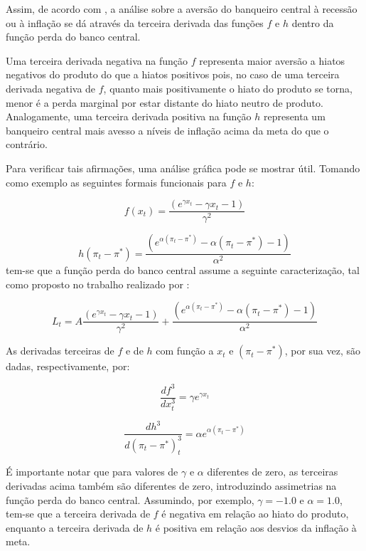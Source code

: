 \documentclass[
	article,			%
	11pt,				%
	oneside,			%
	a4paper,			%
	english,			%
	brazil,				%
	]{abntex2}
\begin{document}
	Assim, de acordo com , a análise sobre a aversão do banqueiro central à recessão ou à inflação se dá através da terceira derivada das funções $f$ e $h$ dentro da função perda do banco central. 
	
	Uma terceira derivada negativa na função $f$ representa maior aversão a hiatos negativos do produto do que a hiatos positivos pois, no caso de uma terceira derivada negativa de $f$, quanto mais positivamente o hiato do produto se torna, menor é a perda marginal por estar distante do hiato neutro de produto. Analogamente, uma terceira derivada positiva na função $h$ representa um banqueiro central mais avesso a níveis de inflação acima da meta do que o contrário.	
	
	Para verificar tais afirmações, uma análise gráfica pode se mostrar útil. Tomando como exemplo as seguintes formais funcionais para $f$ e $h$:
	
	\begin{equation}
		f(x_t) = \frac{(e^{\gamma x_t} - \gamma x_t - 1)}{\gamma^2} 
	\end{equation}
	
	\begin{equation}	
		h(\pi_t - \pi^*) = \frac{(e^{\alpha (\pi_t - \pi^*)} - \alpha (\pi_t - \pi^*) - 1)}{\alpha^2}
	\end{equation}
%
	tem-se que a função perda do banco central assume a seguinte caracterização, tal como proposto no trabalho realizado por :
	
	\begin{equation} \label{eq_aragon_portugal}
		L_t = A \frac{(e^{\gamma x_t} - \gamma x_t - 1)}{\gamma^2} + \frac{(e^{\alpha (\pi_t - \pi^*)} - \alpha (\pi_t - \pi^*) - 1)}{\alpha^2}
	\end{equation}
	
	As derivadas terceiras de $f$ e de $h$ com função a $x_t$ e $(\pi_t - \pi^*)$, por sua vez, são dadas, respectivamente, por:
	
	\begin{equation}
		\frac{df^3}{dx_t^3} = \gamma e^{\gamma x_t}
	\end{equation}
	
	\begin{equation}
		\frac{dh^3}{d(\pi_t - \pi^*)_t^3} = \alpha e^{\alpha (\pi_t - \pi^*)}
	\end{equation}
	
	É importante notar que para valores de $\gamma$ e $\alpha$ diferentes de zero, as terceiras derivadas acima também são diferentes de zero, introduzindo assimetrias na função perda do banco central. Assumindo, por exemplo, $\gamma = -1.0$ e $\alpha = 1.0$, tem-se que a terceira derivada de $f$ é negativa em relação ao hiato do produto, enquanto a terceira derivada de $h$ é positiva em relação aos desvios da inflação à meta.
	
\end{document}
